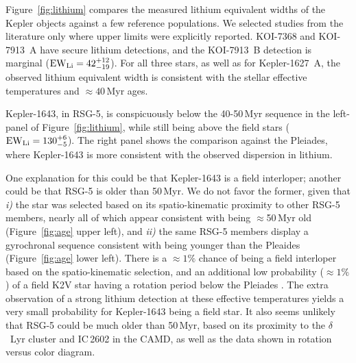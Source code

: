 \documentclass[12pt,twocolumn]{aastex63}
\begin{document}
Figure~\ref{fig:lithium} compares the measured lithium equivalent
widths of the Kepler objects against a few reference populations.  We
selected studies from the literature only where upper limits were
explicitly reported.  KOI-7368 and KOI-7913~A have secure lithium
detections, and the KOI-7913~B detection is marginal (${\rm EW}_{\rm
Li} = 42^{+12}_{-19}$).  For all three stars, as well as for
Kepler-1627~A, the observed lithium equivalent width is consistent
with the stellar effective temperatures and $\approx40$\,Myr ages.

Kepler-1643, in RSG-5, is conspicuously below the 40-50$\,$Myr
sequence in the left-panel of Figure~\ref{fig:lithium}, while still
being above the field stars (${\rm EW}_{\rm Li} = 130^{+6}_{-5}$).
The right panel shows the comparison against the Pleiades, where
Kepler-1643 is more consistent with the observed dispersion in
lithium.

One explanation for this could be that Kepler-1643 is a field
interloper; another could be that RSG-5 is older than 50\,Myr.  We do
not favor the former, given that {\it i)} the star was selected based
on its spatio-kinematic proximity to other RSG-5 members, nearly all
of which appear consistent with being $\approx$50\,Myr old
(Figure~\ref{fig:age} upper left), and {\it ii)} the same RSG-5
members display a gyrochronal sequence consistent with being younger
than the Pleaides (Figure~\ref{fig:age} lower left).  
There is a $\approx$$1\%$ chance of being a field interloper based on
the spatio-kinematic selection, and an additional low probability
($\approx1\%$) of a field K2V star having a rotation period below the
Pleiades \citep{mcquillan_rotation_2014}.
The extra observation of a strong lithium detection at these
effective temperatures yields a very small probability for Kepler-1643 
being a field star.
It also seems unlikely that RSG-5 could be much older than 50\,Myr,
based on its proximity to the $\delta$~Lyr cluster and IC\,2602 in the
CAMD, as well as the data shown in rotation versus color diagram.
\end{document}
